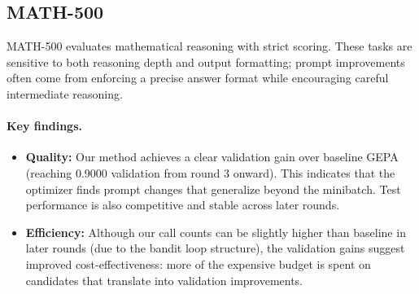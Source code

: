 \begin{table}[H]
\centering
\small
\caption{Comparison between Original GEPA and Ours (\textit{BBH}).}
\label{tab:bbh}
\end{table}

\subsection{MATH-500}
MATH-500 evaluates mathematical reasoning with strict scoring. These tasks are sensitive to both reasoning depth and output formatting; prompt improvements often come from enforcing a precise answer format while encouraging careful intermediate reasoning.

\paragraph{Key findings.}
\begin{itemize}
    \item \textbf{Quality:} Our method achieves a clear validation gain over baseline GEPA (reaching 0.9000 validation from round 3 onward). This indicates that the optimizer finds prompt changes that generalize beyond the minibatch. Test performance is also competitive and stable across later rounds.
    \item \textbf{Efficiency:} Although our call counts can be slightly higher than baseline in later rounds (due to the bandit loop structure), the validation gains suggest improved cost-effectiveness: more of the expensive budget is spent on candidates that translate into validation improvements.
\end{itemize}

